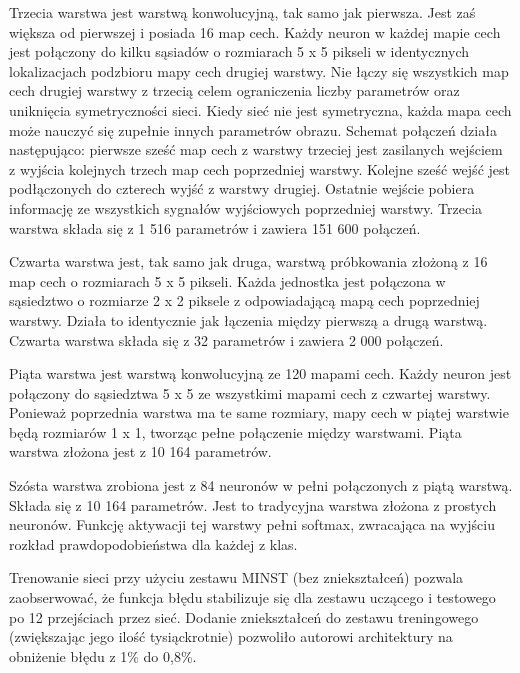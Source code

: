\documentclass[12pt,a4paper,twoside,titlepage,openright]{book}
\begin{document}
Trzecia warstwa jest warstwą konwolucyjną, tak samo jak pierwsza. Jest zaś większa od pierwszej i posiada 16 map cech. Każdy neuron w każdej mapie cech jest połączony do kilku sąsiadów o rozmiarach 5 x 5 pikseli w identycznych lokalizacjach podzbioru mapy cech drugiej warstwy. Nie łączy się wszystkich map cech drugiej warstwy z trzecią celem ograniczenia liczby parametrów oraz uniknięcia symetryczności sieci. Kiedy sieć nie jest symetryczna, każda mapa cech może nauczyć się zupełnie innych parametrów obrazu. Schemat połączeń działa następująco: pierwsze sześć map cech z warstwy trzeciej jest zasilanych wejściem z wyjścia kolejnych trzech map cech poprzedniej warstwy. Kolejne sześć wejść jest podłączonych do czterech wyjść z warstwy drugiej. Ostatnie wejście pobiera informację ze wszystkich sygnałów wyjściowych poprzedniej warstwy. Trzecia warstwa składa się z 1 516 parametrów i zawiera 151 600 połączeń.

Czwarta warstwa jest, tak samo jak druga, warstwą próbkowania złożoną z 16 map cech o rozmiarach 5 x 5 pikseli. Każda jednostka jest połączona w sąsiedztwo o rozmiarze 2 x 2 piksele z odpowiadającą mapą cech poprzedniej warstwy. Działa to identycznie jak łączenia między pierwszą a drugą warstwą. Czwarta warstwa składa się z 32 parametrów i zawiera 2 000 połączeń.

Piąta warstwa jest warstwą konwolucyjną ze 120 mapami cech. Każdy neuron jest połączony do sąsiedztwa 5 x 5 ze wszystkimi mapami cech z czwartej warstwy. Ponieważ poprzednia warstwa ma te same rozmiary, mapy cech w piątej warstwie będą rozmiarów 1 x 1, tworząc pełne połączenie między warstwami. Piąta warstwa złożona jest z 10 164 parametrów.

Szósta warstwa zrobiona jest z 84 neuronów w pełni połączonych z piątą warstwą. Składa się z 10 164 parametrów. Jest to tradycyjna warstwa złożona z prostych neuronów. Funkcję aktywacji tej warstwy pełni softmax, zwracająca na wyjściu rozkład prawdopodobieństwa dla każdej z klas.

Trenowanie sieci przy użyciu zestawu MINST (bez zniekształceń) pozwala zaobserwować, że funkcja błędu stabilizuje się dla zestawu uczącego i testowego po 12 przejściach przez sieć. Dodanie zniekształceń do zestawu treningowego (zwiększając jego ilość tysiąckrotnie) pozwoliło autorowi architektury na obniżenie błędu z 1\% do 0,8\%.
\end{document}
